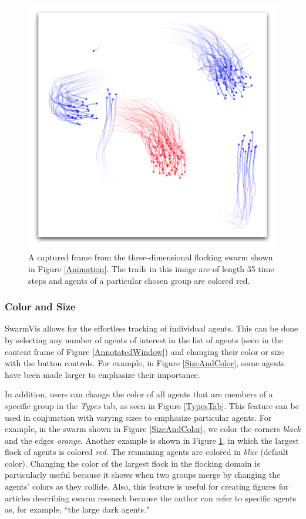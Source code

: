 \documentclass{vgtc}
\begin{document}
\begin{figure}
\centering
\includegraphics[scale=.45]{images/flockcolor.pdf}
\caption{
A captured frame from the three-dimensional flocking swarm shown in Figure \ref{Animation}.
The trails in this image are of length 35 time steps and agents of a particular chosen group are colored red.}
\label{FlockColor}
\end{figure}


\subsubsection{Color and Size}

SwarmVis allows for the effortless tracking of individual agents.
This can be done by selecting any number of agents of interest in the list of agents
(seen in the content frame of Figure \ref{AnnotatedWindow})
and changing their color or size with the button controls.
For example, in Figure \ref{SizeAndColor}, some agents have been made larger to emphasize their importance.

In addition, users can change the color of all agents that are members of a specific group in the \textit{Types} tab, as seen
in Figure \ref{TypesTab}.
This feature can be used in conjunction with varying sizes to emphasize particular agents.
For example, in the swarm shown in
Figure \ref{SizeAndColor}, we color the corners \textit{black} and the edges \textit{orange}.
Another example is shown in Figure \ref{FlockColor}, in which the largest flock of agents is colored \textit{red}.
The remaining agents are colored in \textit{blue} (default color).
Changing the color of the largest flock in the flocking domain is
particularly useful because it shows when two groups merge by changing the agents' colors as they collide.
Also, this feature is useful for creating figures for articles describing swarm research because
 the author can refer to specific agents as, for example, ``the large dark agents."
\end{document}
